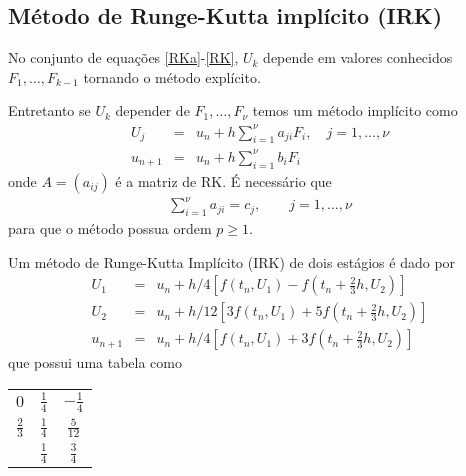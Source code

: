 \subsection{Método de Runge-Kutta implícito (IRK)}
No conjunto de equações \eqref{RKa}-\eqref{RK}, $U_k$ depende em valores conhecidos $F_1,\ldots ,F_{k-1}$ tornando o método explícito.

Entretanto se $U_k$ depender de $F_1,\ldots ,F_\nu $ temos um método implícito como
\begin{eqnarray}\label{IRK}
  U_j &=&u_n  + h \sum_{i=1}^\nu  a_{ji} F_i, \quad  j=1,\ldots ,\nu \\
  u_{n+1}&=&u_n  + h \sum_{i=1}^{\nu } b_i F_i
\end{eqnarray}
onde $A=(a_{ij})$ é a matriz de RK. É necessário que
\begin{eqnarray}
 \sum_{i=1}^{\nu } a_{ji} = c_j, \quad \quad  j=1,\ldots ,\nu
\end{eqnarray}
para que o método possua ordem $p\geq 1$.


\begin{ex}
Um método de Runge-Kutta Implícito (IRK) de dois estágios é dado por
\begin{eqnarray}
  U_1 &=&u_n  + h/4  [ f(t_n,U_1) - f(t_n+\frac{2}{3}h,U_2)]\\
  U_2 &=&u_n  + h/12 [3f(t_n,U_1) +5f(t_n+\frac{2}{3}h,U_2)]\\
  u_{n+1}&=&u_n  + h/4 [f(t_n,U_1) +3f(t_n+\frac{2}{3}h,U_2)]
\end{eqnarray}
que possui uma tabela como

\begin{tabular}{c|cc}
  $0$ & $\frac{1}{4}$ &$-\frac{1}{4}$  \\
  $\frac{2}{3}$ & $\frac{1}{4}$ &$\frac{5}{12}$  \\  \hline
      & $\frac{1}{4}$ &$\frac{3}{4}$
\end{tabular}

\end{ex}


